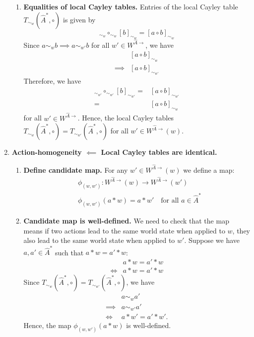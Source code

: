 \begin{proofE}
\begin{enumerate}
\begin{enumerate}
    \item \textbf{Equalities of local Cayley tables.}
    Entries of the local Cayley table $T_{\sim_{w}}(\hat{A}^{*}, \circ)$ is given by
    \begin{equation}
        [a]_{\sim_{w}} \circ_{\sim_{w}} [b]_{\sim_{w}} = [a \circ b]_{\sim_{w}}
    \end{equation}
    Since $a \sim_{w} b \implies a \sim_{w'} b$ for all $w' \in W^{\hat{A}\to}$, we have
    \begin{align}
        & [a \circ b]_{\sim_{w}} \\
        \implies & [a \circ b]_{\sim_{w'}}
    \end{align}
    Therefore, we have
    \begin{align}
        [a]_{\sim_{w'}} \circ_{\sim_{w'}} [b]_{\sim_{w'}} = & [a \circ b]_{\sim_{w'}} \\
        = & [a \circ b]_{\sim_{w}}
    \end{align}
    for all $w' \in W^{\hat{A}\to}$.
    Hence, the local Cayley tables $T_{\sim_{w}}(\hat{A}^{*}, \circ) = T_{\sim_{w'}}(\hat{A}^{*}, \circ)$ for all $w' \in W^{\hat{A}\to}(w)$.
    \end{enumerate}
    
    \item \textbf{Action-homogeneity $\impliedby$ Local Cayley tables are identical.}
    \begin{enumerate}
        \item \textbf{Define candidate map.}
        For any $w' \in W^{\hat{A}\to}(w)$ we define a map:
        \begin{equation}
        \begin{aligned}
            & \phi_{(w, w')}: W^{\hat{A}\to}(w) \to W^{\hat{A}\to}(w') \\
            & \phi_{(w, w')}(a \ast w) = a \ast w' \quad \text{for all $a \in \hat{A}^{*}$}
        \end{aligned}
        \end{equation}

        \item \textbf{Candidate map is well-defined.}
        We need to check that the map means if two actions lead to the same world state when applied to $w$, they also lead to the same world state when applied to $w'$.
        Suppose we have $a, a' \in \hat{A}^{*}$ such that $a \ast w = a' \ast w$:
        \begin{align}
            & a \ast w = a' \ast w \\
            \iff & a \ast w = a' \ast w
        \end{align}
        Since $T_{\sim_{w}}(\hat{A}^{*}, \circ) = T_{\sim_{w'}}(\hat{A}^{*}, \circ)$, we have
        \begin{align}
            & a \sim_{w} a' \\
            \implies & a \sim_{w'} a' \\
            \iff & a \ast w' = a' \ast w'.
        \end{align}
        Hence, the map $\phi_{(w, w')}(a \ast w)$ is well-defined.


\end{enumerate}
\end{enumerate}
\end{proofE}
